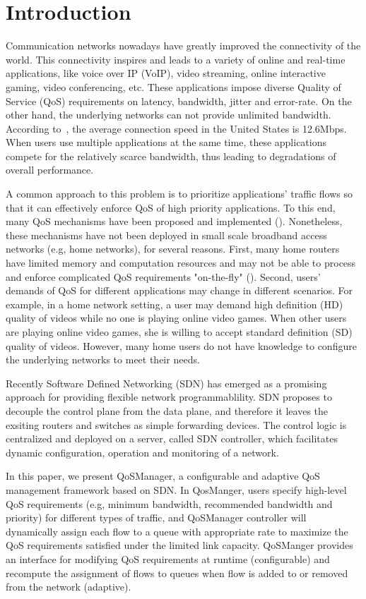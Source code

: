 \section{Introduction}
\label{sect:intro}

Communication networks nowadays have greatly improved the connectivity of the world. This connectivity
inspires and leads to a variety of online and real-time applications, like voice over IP (VoIP), video
streaming, online interactive gaming, video conferencing, etc. These applications impose diverse Quality
of Service (QoS) requirements on latency, bandwidth, jitter and error-rate. On the other hand, the
underlying networks can not provide unlimited bandwidth. According to~\cite{akamai}, the average
connection speed in the United States is 12.6Mbps. When users use multiple applications at the same time,
these applications compete for the relatively scarce bandwidth, thus leading to degradations of overall
performance.

A common approach to this problem is to prioritize applications' traffic flows so that it can effectively
enforce QoS of high priority applications. To this end, many QoS mechanisms have been proposed and
implemented (). Nonetheless, these mechanisms have not been deployed in small scale broadband
access networks (e.g, home networks), for several reasons. First, many home routers have limited memory and
computation resources and may not be able to process and enforce complicated QoS requirements "on-the-fly"
(). Second, users' demands of QoS for different applications may change in different scenarios. 
For example, in a home network setting, a user may demand high definition (HD) quality of videos while no one
is playing online video games. When other users are playing online video games, she is willing to accept standard
definition (SD) quality of videos. However, many home users do not have knowledge to configure the underlying
networks to meet their needs.

Recently Software Defined Networking (SDN) has emerged as a promising approach for providing flexible network
programmablility. SDN proposes to decouple the control plane from the data plane, and therefore it leaves the
exsiting routers and switches as simple forwarding devices. The control logic is centralized and deployed on a
server, called SDN controller, which facilitates dynamic configuration, operation and monitoring of a network.

In this paper, we present QoSManager, a configurable and adaptive QoS management framework based on SDN. In
QosManger, users specify high-level QoS requirements (e.g, minimum bandwidth, recommended bandwidth and priority)
for different types of traffic, and QoSManager controller will dynamically assign each flow to a queue with
appropriate rate to maximize the QoS requirements satisfied under the limited link capacity. QoSManger provides an
interface for modifying QoS requirements at runtime (configurable) and recompute the assignment of flows to queues
when flow is added to or removed from the network (adaptive).

